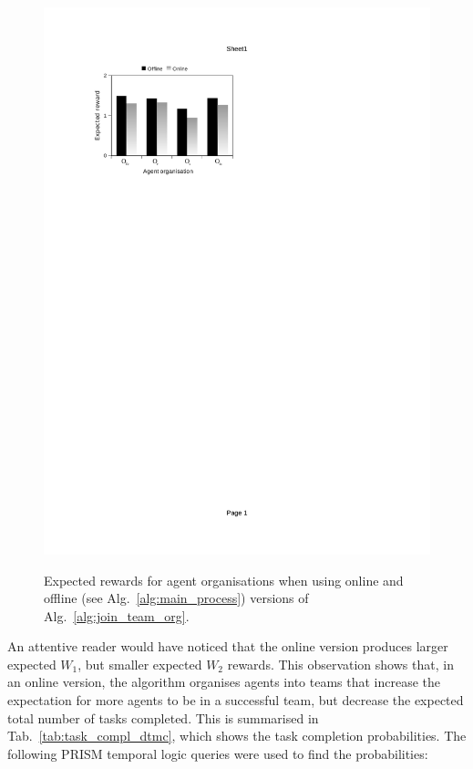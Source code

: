 \documentclass{llncs}
\begin{document}
\begin{figure}[h]
{{  \includegraphics[clip=true, trim=70 579 300 90, scale=0.77]{images/w2_dtmc}
}}
\caption{Expected rewards for agent organisations when using online and offline (see Alg.~\ref{alg:main_process}) versions of Alg.~\ref{alg:join_team_org}.}
\label{fig:bar_chart_dtmc}
\end{figure}
An attentive reader would have noticed that the online version produces larger expected $W_1$, but smaller expected $W_2$ rewards. This observation shows that, in an online version, the algorithm organises agents into teams that increase the expectation for more agents to be in a successful team, but decrease the expected total number of tasks completed. This is summarised in Tab.~\ref{tab:task_compl_dtmc}, which shows the task completion probabilities. The following PRISM temporal logic queries were used to find the probabilities:
\end{document}
